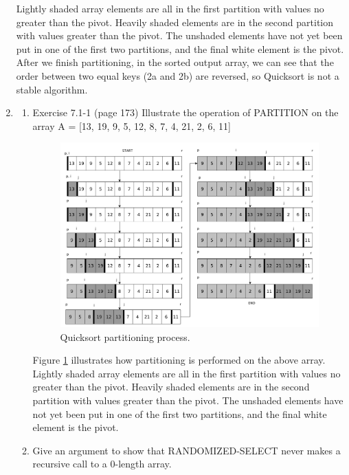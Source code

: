 \documentclass[11pts]{report}
\begin{document}
\begin{enumerate}
Lightly shaded array elements are all in the first partition with values no greater than the pivot. Heavily shaded elements are in the second partition with values greater than the pivot. The unshaded elements have not yet been put in one of the first two partitions, and the final white element is the pivot. After we finish partitioning, in the sorted output array, we can see that the order between two equal keys (2a and 2b) are reversed, so Quicksort is not a stable algorithm.

\item 
\begin{enumerate}
\item Exercise 7.1-1 (page 173)
Illustrate the operation of PARTITION on the array A = [13, 19, 9, 5, 12, 8, 7, 4, 21, 2, 6, 11]

\begin{figure}[htbp]
\begin{center}
\includegraphics[scale=0.25]{3a.pdf}
\caption{Quicksort partitioning process.}
\label{Fig:5a}
\end{center}
\end{figure}

Figure \ref{Fig:5a} illustrates how partitioning is performed on the above array. Lightly shaded array elements are all in the first partition with values no greater than the pivot. Heavily shaded elements are in the second partition with values greater than the pivot. The unshaded elements have not yet been put in one of the first two partitions, and the final white element is the pivot.

\item Give an argument to show that RANDOMIZED-SELECT never makes a recursive call to a 0-length array.


\end{enumerate}
\end{enumerate}
\end{document}
